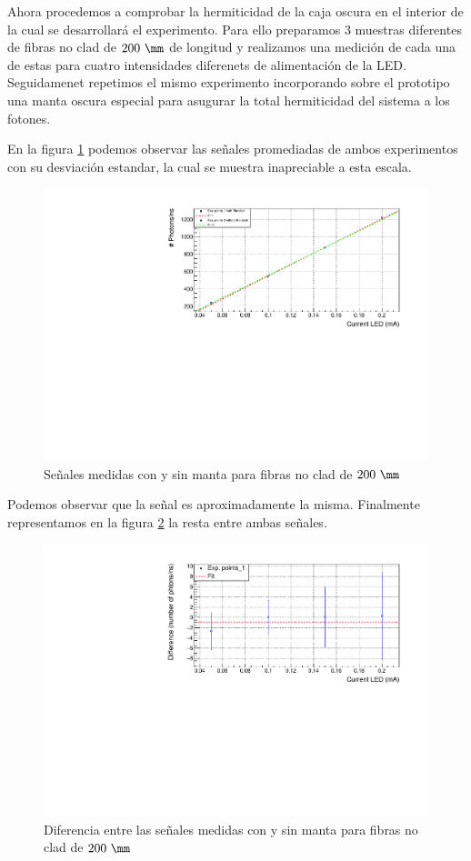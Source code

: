 Ahora procedemos a comprobar la hermiticidad de la caja oscura en el interior de la cual se desarrollará el experimento. Para ello preparamos 3 muestras diferentes de fibras no clad de $200~\mm$ de longitud y realizamos una medición de cada una de estas para cuatro intensidades diferenets de alimentación de la LED. Seguidamenet repetimos el mismo experimento incorporando sobre el prototipo una manta oscura especial para asugurar la total hermiticidad del sistema a los fotones.

En la figura \ref{plotmanta} podemos observar las señales promediadas de ambos experimentos con su desviación estandar, la cual se muestra inapreciable a esta escala.

\begin{figure}[H]
\centering
\includegraphics[scale=0.7]{Figuras/cases.pdf}
\caption{Señales medidas con y sin manta para fibras no clad de $200~\mm$\label{plotmanta}}
\end{figure}

Podemos observar que la señal es aproximadamente la misma. Finalmente representamos en la figura \ref{diferencia} la resta entre ambas señales.

\begin{figure}[H]
\centering
\includegraphics[scale=0.7]{Figuras/difference.pdf}
\caption{Diferencia entre las señales medidas con y sin manta para fibras no clad de $200~\mm$\label{diferencia}}
\end{figure}

